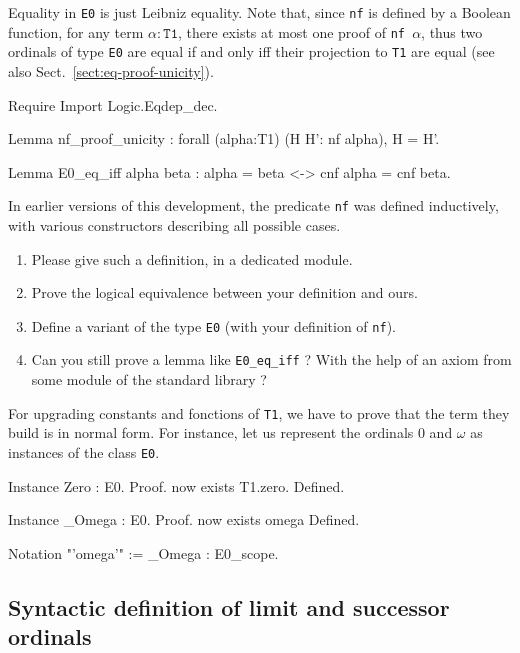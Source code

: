 \documentclass[a4paper]{book}
\begin{document}
Equality in \texttt{E0} is just Leibniz equality. Note that, since \texttt{nf} is
defined by a Boolean function, for  any term $\alpha:\texttt{T1}$, there exists at most one proof of \texttt{nf $\alpha$}, thus two ordinals of type \texttt{E0} are
equal if and only iff their projection to \texttt{T1} are equal (see also Sect.~\vref{sect:eq-proof-unicity}).


\begin{Coqsrc}
Require Import Logic.Eqdep_dec.

Lemma nf_proof_unicity :
  forall (alpha:T1) (H H': nf alpha), H = H'.

Lemma E0_eq_iff alpha beta : alpha = beta <-> cnf alpha = cnf beta.
\end{Coqsrc}

\begin{exercise}
In earlier versions of this development, the predicate \texttt{nf} was defined  inductively, with various constructors describing all possible cases.
\begin{enumerate}
\item Please give such a definition, in a dedicated module.
\item Prove the logical equivalence between your definition and ours.
\item Define a variant of the type \texttt{E0} (with your definition of \texttt{nf}).
\item Can you still prove a lemma like \texttt{E0\_eq\_iff} ? With the help of an axiom from some module of the standard library ?
\end{enumerate}
\end{exercise}
For upgrading constants and fonctions of \texttt{T1}, we have to prove that 
the term they build is in normal form.
For instance, let us represent the ordinals $0$ and $\omega$ as instances of the class \texttt{E0}.

\label{sect:omega-T1}

\begin{Coqsrc}
Instance Zero : E0.
Proof.
  now exists T1.zero.
Defined.

Instance _Omega : E0.
Proof.  now exists omega%
Defined.

Notation "'omega'"  := _Omega : E0_scope.
\end{Coqsrc}



\subsection{Syntactic definition of limit and successor ordinals}
\end{document}
